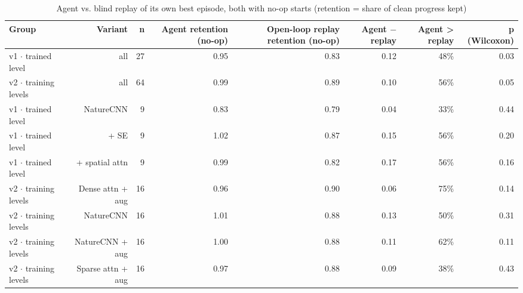 \begin{table}[t]
\centering
\caption{Agent vs. blind replay of its own best episode, both with no-op starts (retention = share of clean progress kept)}
\label{tab:replay_comparison}
\begin{tabular}{lrrrrrrr}
\toprule
Group & Variant & n & Agent retention (no-op) & Open-loop replay retention (no-op) & Agent $-$ replay & Agent > replay & p (Wilcoxon) \\
\midrule
v1 $\cdot$ trained level & all & 27 & 0.95 & 0.83 & 0.12 & 48\% & 0.03 \\
v2 $\cdot$ training levels & all & 64 & 0.99 & 0.89 & 0.10 & 56\% & 0.05 \\
v1 $\cdot$ trained level & NatureCNN & 9 & 0.83 & 0.79 & 0.04 & 33\% & 0.44 \\
v1 $\cdot$ trained level & + SE & 9 & 1.02 & 0.87 & 0.15 & 56\% & 0.20 \\
v1 $\cdot$ trained level & + spatial attn & 9 & 0.99 & 0.82 & 0.17 & 56\% & 0.16 \\
v2 $\cdot$ training levels & Dense attn + aug & 16 & 0.96 & 0.90 & 0.06 & 75\% & 0.14 \\
v2 $\cdot$ training levels & NatureCNN & 16 & 1.01 & 0.88 & 0.13 & 50\% & 0.31 \\
v2 $\cdot$ training levels & NatureCNN + aug & 16 & 1.00 & 0.88 & 0.11 & 62\% & 0.11 \\
v2 $\cdot$ training levels & Sparse attn + aug & 16 & 0.97 & 0.88 & 0.09 & 38\% & 0.43 \\
\bottomrule
\end{tabular}
\end{table}
